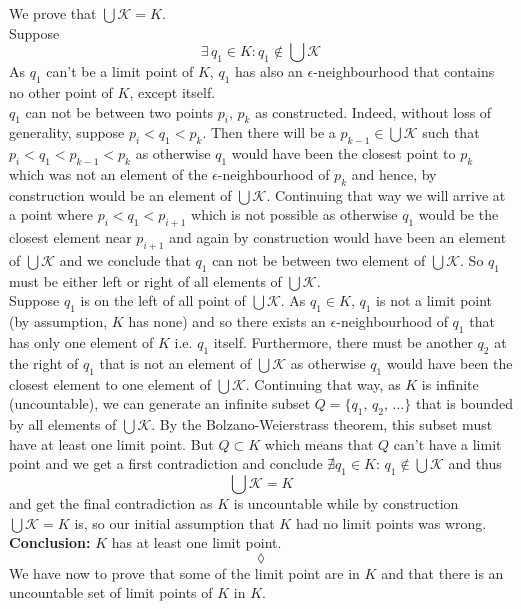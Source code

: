 We prove that $\bigcup \mathscr{K}= K$.\\
Suppose $$\exists\, q_1\in K: q_1\not\in \bigcup \mathscr{K}$$
As $q_1$ can't be a limit point of $K$, $q_1$ has also an $\epsilon$-neighbourhood that contains no other point of $K$, except itself.\\
$q_1$ can not be between two points $p_i,\, p_k$ as constructed. Indeed, without loss of generality, suppose $p_i < q_1 < p_k$. Then there will be a $p_{k-1}\in \bigcup \mathscr{K}$ such that 
$p_i < q_1 < p_{k-1}< p_k$ as otherwise $q_1$ would have been the closest point to $p_k$ which was not an element of the $\epsilon$-neighbourhood of $p_k$ and hence, by construction would be an element of $\bigcup \mathscr{K}$.  Continuing that way we will arrive at a point where $p_i < q_1 < p_{i+1}$ which is not possible as otherwise $q_1$ would be the closest element near $p_{i+1}$ and again by construction would have been an element of $\bigcup \mathscr{K}$ and we conclude that $q_1$ can not be between two element of $\bigcup \mathscr{K}$. So $q_1$ must be either left or right of all elements of $\bigcup \mathscr{K}$.\\
Suppose $q_1$ is on the left of all point of $\bigcup \mathscr{K}$. As $q_1\in K$, $q_1$ is not a limit point (by assumption, $K$ has none) and so there exists an $\epsilon$-neighbourhood of $q_1$ that has only one element of $K$ i.e. $q_1$ itself. Furthermore, there must be another $q_2$ at the right of $q_1$ that is not an element of $\bigcup \mathscr{K}$ as otherwise $q_1$ would have been the closest element to one element of $\bigcup \mathscr{K}$. Continuing that way, as $K$ is infinite (uncountable), we can generate an infinite subset $Q=\{q_1,\, q_2,\, \dots\}$ that is bounded by all elements of $\bigcup \mathscr{K}$. By the Bolzano-Weierstrass theorem, this subset must have at least one limit point. But $Q\subset K$ which means that $Q$ can't have a limit point and we get a first contradiction and conclude $\nexists q_1\in K:\,  q_1 \not\in  \bigcup \mathscr{K}$ and thus 
$$\bigcup \mathscr{K}= K$$
and get the final contradiction as $K$ is uncountable while by construction $\bigcup \mathscr{K}= K$ is, so our  initial assumption that $K$ had no limit points was wrong.\\
\textbf{Conclusion:} $K$ has at least one limit point.
$$\lozenge$$
We have now to prove that some of the limit point are in $K$ and that there is an uncountable set of limit points of $K$ in $K$.\\

